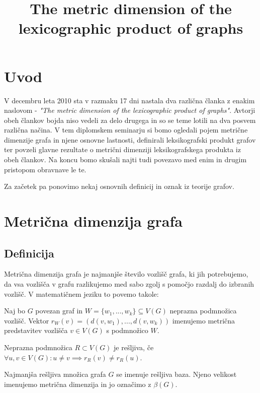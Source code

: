 \documentclass[mat1, tisk]{fmfdelo}
\title{The metric dimension of the lexicographic product of graphs}
\begin{document}
\section{Uvod}
V decembru leta 2010 sta v razmaku 17 dni nastala dva različna članka z enakim naslovom - 
\textit{"The metric dimension of the lexicographic product of graphs"}. Avtorji obeh člankov bojda niso vedeli za delo drugega 
in so se teme lotili na dva posvem različna načina. V tem diplomskem seminarju si bomo ogledali pojem metrične dimenzije grafa in 
njene osnovne lastnosti, definirali leksikografski produkt grafov ter povzeli glavne rezultate o metrični dimenziji leksikografskega 
produkta iz obeh člankov. Na koncu bomo skušali najti tudi povezavo med enim in drugim pristopom obravnave le te. 

Za začetek pa ponovimo nekaj osnovnih definicij in oznak iz teorije grafov. 


\section{Metrična dimenzija grafa}


\subsection{Definicija}

Metrična dimenzija grafa je najmanjše število vozlišč grafa, ki jih potrebujemo, da
vsa vozlišča v grafu razlikujemo med sabo zgolj s pomočjo razdalj do izbranih vozlišč.
V matematičnem jeziku to povemo takole:

\begin{definicija}
    Naj bo $G$ povezan graf in $W = \{ w_1, ... , w_k  \} \subseteq V(G)$ neprazna podmnožica vozlišč. 
    Vektor $r_W(v) = (d(v, w_1), ..., d(v, w_k))$ imenujemo metrična predstavitev vozlišča $v \in V(G)$ s podmnožico $W$.
\end{definicija}

\begin{definicija}
    Neprazna podmnožica $R \subset V(G)$ je rešljiva,
    če $\forall u, v \in V(G): u \neq v \implies r_R(v) \neq r_R(u)$.
\end{definicija}

\begin{definicija}
    Najmanjša rešljiva množica grafa $G$ se imenuje rešljiva baza. Njeno velikost imenujemo metrična dimenzija in jo označimo z $\beta(G).$ 
\end{definicija}
\end{document}
